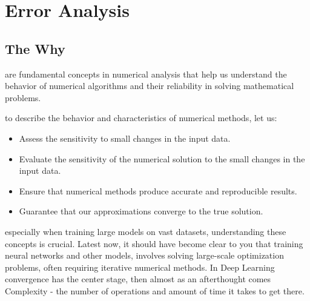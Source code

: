\chapter{Error Analysis}


\section{The Why}


 are fundamental concepts in numerical analysis that help us understand the behavior of numerical algorithms and their reliability in solving mathematical problems.


 to describe the behavior and characteristics of numerical methods, let us:
\begin{itemize}
    \item Assess the sensitivity to small changes in the input data.
    \item Evaluate the sensitivity of the numerical solution to the small changes in the input data.
    \item Ensure that numerical methods produce accurate and reproducible results.
    \item Guarantee that our approximations converge to the true solution.
\end{itemize} 


 especially when training large models on vast datasets, understanding these concepts is crucial.
Latest now, it should have become clear to you that training neural networks and other models, involves solving large-scale optimization problems, often requiring iterative numerical methods.
In Deep Learning convergence has the center stage, then almost as an afterthought comes Complexity - the number of operations and amount of time it takes to get there.

